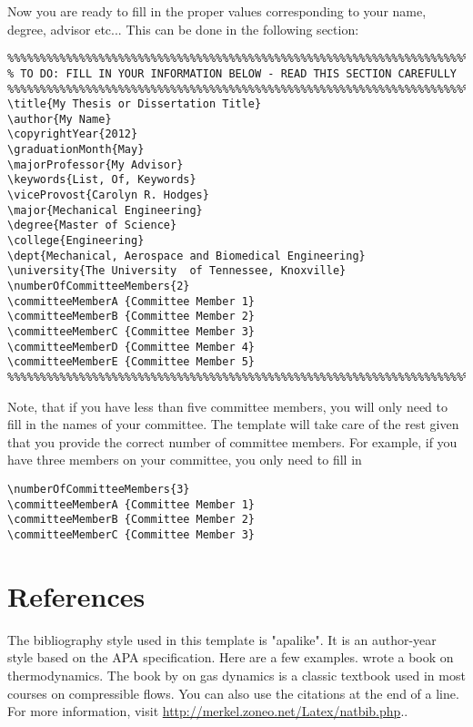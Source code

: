 Now you are ready to fill in the proper values corresponding to your name, degree, advisor etc... This can be done in the following section:
\begin{verbatim}
%%%%%%%%%%%%%%%%%%%%%%%%%%%%%%%%%%%%%%%%%%%%%%%%%%%%%%%%%%%%%%%%%%%%%%%%%%%
% TO DO: FILL IN YOUR INFORMATION BELOW - READ THIS SECTION CAREFULLY
%%%%%%%%%%%%%%%%%%%%%%%%%%%%%%%%%%%%%%%%%%%%%%%%%%%%%%%%%%%%%%%%%%%%%%%%%%%
\title{My Thesis or Dissertation Title}
\author{My Name}
\copyrightYear{2012}
\graduationMonth{May}
\majorProfessor{My Advisor}
\keywords{List, Of, Keywords}
\viceProvost{Carolyn R. Hodges}
\major{Mechanical Engineering}
\degree{Master of Science}
\college{Engineering}
\dept{Mechanical, Aerospace and Biomedical Engineering}
\university{The University  of Tennessee, Knoxville}
\numberOfCommitteeMembers{2}
\committeeMemberA {Committee Member 1}
\committeeMemberB {Committee Member 2}
\committeeMemberC {Committee Member 3}
\committeeMemberD {Committee Member 4}
\committeeMemberE {Committee Member 5}
%%%%%%%%%%%%%%%%%%%%%%%%%%%%%%%%%%%%%%%%%%%%%%%%%%%%%%%%%%%%%%%%%%%%%%%%%%%
\end{verbatim}
Note, that if you have less than five committee members, you will only need to fill in the names of your committee. The template will take care of the rest given that you provide the correct number of committee members. For example, if you have three members on your committee, you only need to fill in
\begin{verbatim}
\numberOfCommitteeMembers{3}
\committeeMemberA {Committee Member 1}
\committeeMemberB {Committee Member 2}
\committeeMemberC {Committee Member 3}
\end{verbatim}

\section{References}
The bibliography style used in this template is "apalike". It is an author-year style based on the APA specification. Here are a few examples.  wrote a book on thermodynamics. The book by  on gas dynamics is a classic textbook used in most courses on compressible flows. You can also use the citations at the end of a line. For more information, visit \href{http://merkel.zoneo.net/Latex/natbib.php}{http://merkel.zoneo.net/Latex/natbib.php}.\citep{robinson2008ph}.

